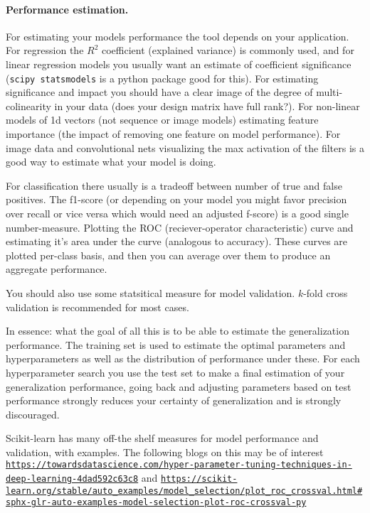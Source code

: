 \documentclass[%
oneside,                 %
final,                   %
10pt]{article}
\begin{document}
\paragraph{Performance estimation.}
For estimating your models performance the tool depends on your
application. For regression the $R^2$ coefficient (explained variance)
is commonly used, and for linear regression models you usually want an
estimate of coefficient significance (\texttt{scipy statsmodels} is a python
package good for this). For estimating significance and impact you
should have a clear image of the degree of multi-colinearity in your
data (does your design matrix have full rank?). For non-linear models
of 1d vectors (not sequence or image models) estimating feature
importance (the impact of removing one feature on model
performance). For image data and convolutional nets visualizing the
max activation of the filters is a good way to estimate what your
model is doing.

For classification there usually is a tradeoff between number of true
and false positives. The f1-score (or depending on your model you
might favor precision over recall or vice versa which would need an
adjusted f-score) is a good single number-measure. Plotting the ROC
(reciever-operator characteristic) curve and estimating it's area
under the curve (analogous to accuracy). These curves are plotted
per-class basis, and then you can average over them to produce an
aggregate performance.

You should also use some statsitical measure for model
validation. $k$-fold cross validation is recommended for most cases.

In essence: what the goal of all this is to be able to estimate the
generalization performance. The training set is used to estimate the
optimal parameters and hyperparameters as well as the distribution of
performance under these. For each hyperparameter search you use the
test set to make a final estimation of your generalization
performance, going back and adjusting parameters based on test
performance strongly reduces your certainty of generalization and is
strongly discouraged.

Scikit-learn has many off-the shelf measures for model performance and validation, with examples.  The following blogs on this may be of interest
\href{{https://towardsdatascience.com/hyper-parameter-tuning-techniques-in-deep-learning-4dad592c63c8}}{\nolinkurl{https://towardsdatascience.com/hyper-parameter-tuning-techniques-in-deep-learning-4dad592c63c8}} and 
\href{{https://scikit-learn.org/stable/auto_examples/model_selection/plot_roc_crossval.html#sphx-glr-auto-examples-model-selection-plot-roc-crossval-py}}{\nolinkurl{https://scikit-learn.org/stable/auto_examples/model_selection/plot_roc_crossval.html\#sphx-glr-auto-examples-model-selection-plot-roc-crossval-py}}
\end{document}

